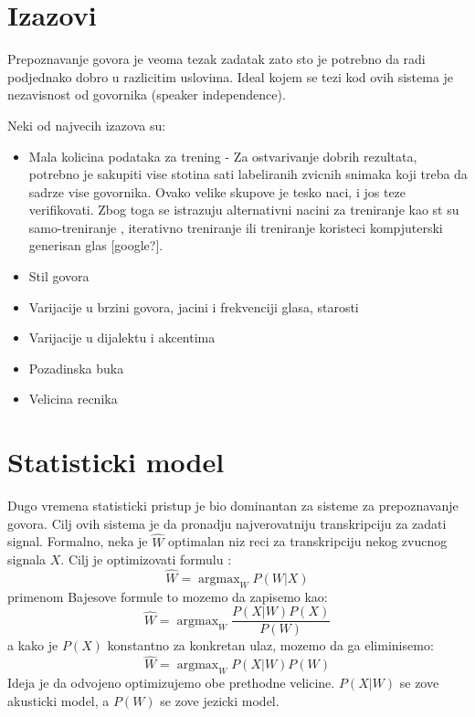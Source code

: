 \documentclass[a4paper]{article}
\DeclareMathOperator*{\argmax}{argmax}
\begin{document}
\section{Izazovi}
Prepoznavanje govora je veoma tezak zadatak zato sto je potrebno da radi podjednako dobro u razlicitim uslovima. %
Ideal kojem se tezi kod ovih sistema je nezavisnost od govornika (speaker independence).

Neki od najvecih izazova su:
\begin{itemize}
  \item Mala kolicina podataka za trening - Za ostvarivanje dobrih rezultata, potrebno je sakupiti vise stotina sati labeliranih zvicnih snimaka koji treba da sadrze vise govornika. Ovako velike skupove je tesko naci, i jos teze verifikovati. Zbog toga se istrazuju alternativni nacini za treniranje kao st su samo-treniranje \cite{baevski2020wav2vec}, iterativno treniranje \cite{park2020noisy} ili treniranje koristeci kompjuterski generisan glas [google?]. %
  \item Stil govora %
  \item Varijacije u brzini govora, jacini i frekvenciji glasa, starosti %
  \item Varijacije u dijalektu i akcentima
  \item Pozadinska buka
  \item Velicina recnika
\end{itemize}

\section{Statisticki model}
Dugo vremena statisticki pristup je bio dominantan za sisteme za prepoznavanje govora.
Cilj ovih sistema je da pronadju najverovatniju transkripciju za zadati signal.
Formalno, neka je $\hat{W}$ optimalan niz reci za transkripciju nekog zvucnog signala $X$. Cilj je optimizovati formulu \cite{kamath2019nlp}:
\begin{equation*}
  \hat{W} = \argmax_{W} P(W|X)
\end{equation*}
primenom Bajesove formule to mozemo da zapisemo kao:
\begin{equation*}
  \hat{W} = \argmax_{W} \frac{P(X|W) P(X)}{P(W)}
\end{equation*}
a kako je $P(X)$ konstantno za konkretan ulaz, mozemo da ga eliminisemo:
\begin{equation*}
  \hat{W} = \argmax_{W} P(X|W) P(W)
\end{equation*}
Ideja je da odvojeno optimizujemo obe prethodne velicine.
$P(X|W)$ se zove akusticki model, a $P(W)$ se zove jezicki model.
\end{document}
